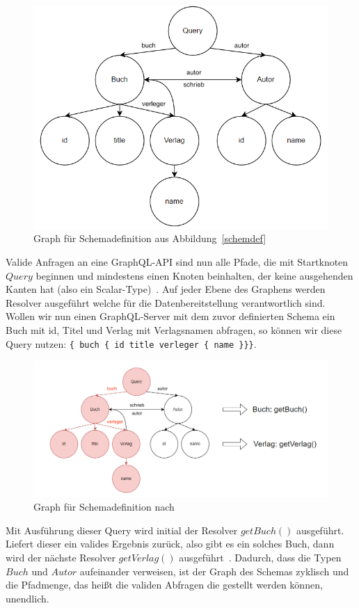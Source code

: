 \begin{figure}[htb]
    \centering
    \includegraphics[width=\textwidth,height=0.4\textheight,keepaspectratio]{img/graph}
    \caption{Graph für Schemadefinition aus Abbildung~\ref{schemdef}}
\end{figure}

Valide Anfragen an eine GraphQL-API sind nun alle Pfade, die mit Startknoten $Query$ beginnen und mindestens einen Knoten beinhalten,
der keine ausgehenden Kanten hat (also ein Scalar-Type)~\cite[vgl. Modelling with GraphQL]{graphqlgraphtheory}.
Auf jeder Ebene des Graphens werden Resolver ausgeführt welche für die Datenbereitstellung verantwortlich sind.
Wollen wir nun einen GraphQL-Server mit dem zuvor definierten Schema ein Buch mit id, Titel und Verlag mit Verlagsnamen abfragen,
so können wir diese Query nutzen: \verb+{ buch { id title verleger { name }}}+.

\begin{figure}[htb]
    \centering
    \includegraphics[width=\textwidth,height=0.4\textheight,keepaspectratio]{img/graphresolver}
    \caption{Graph für Schemadefinition nach \cite{graphqlgraphtheory}}
\end{figure}

Mit Ausführung dieser Query wird initial der Resolver $getBuch()$ ausgeführt.
Liefert dieser ein valides Ergebnis zurück, also gibt es ein solches Buch,
dann wird der nächste Resolver $getVerlag()$ ausgeführt~\cite[vgl. Resolver]{graphqlgraphtheory}.
Dadurch, dass die Typen $Buch$ und $Autor$ aufeinander verweisen, ist der Graph des Schemas zyklisch und die Pfadmenge,
das heißt die validen Abfragen die gestellt werden können, unendlich.
